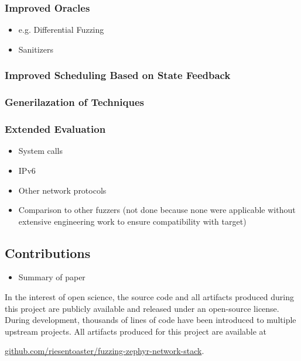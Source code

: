 \documentclass{article}
\begin{document}
\begin{multicols}{2}
  \subsubsection{Improved Oracles}
  \begin{itemize}
    \item e.g. Differential Fuzzing
    \item Sanitizers
  \end{itemize}
  \subsubsection{Improved Scheduling Based on State Feedback}
  \subsubsection{Generilazation of Techniques}
  \subsubsection{Extended Evaluation}
  \begin{itemize}
    \item System calls
    \item IPv6
    \item Other network protocols
    \item Comparison to other fuzzers (not done because none were applicable without extensive engineering work to ensure compatibility with target)
  \end{itemize}

  \subsection{Contributions}
  \begin{itemize}
    \item Summary of paper
  \end{itemize}

\end{multicols}
\vspace{30px}
\begin{center}
  \begin{minipage}{0.75\textwidth}
    \centering
    In the interest of open science, the source code and all artifacts produced during this project are publicly available and released under an open-source license. During development, thousands of lines of code have been introduced to multiple upstream projects. All artifacts produced for this project are available at

    \vspace{8px}

    \href{https://github.com/riesentoaster/fuzzing-zephyr-network-stack}{github.com/riesentoaster/fuzzing-zephyr-network-stack}.
  \end{minipage}
\end{center}

\vspace{50px}

\end{document}
